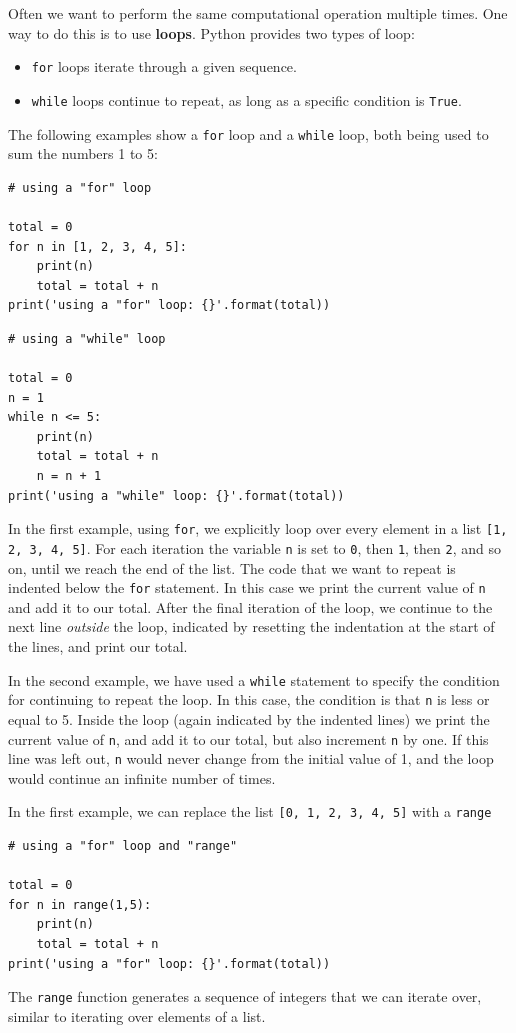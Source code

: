 \documentclass[a4paper]{article}
\begin{document}
Often we want to perform the same computational operation multiple times. One way to do this is to use \textbf{loops}. Python provides two types of loop: 
\begin{itemize}
	\item{\texttt{for} loops iterate through a given sequence.}
	\item{\texttt{while} loops continue to repeat, as long as a specific condition is \texttt{True}.}
\end{itemize}
The following examples show a \texttt{for} loop and a \texttt{while} loop, both being used to sum the numbers 1 to 5:
\begin{lstlisting}
# using a "for" loop

total = 0
for n in [1, 2, 3, 4, 5]:
    print(n)
    total = total + n
print('using a "for" loop: {}'.format(total))
\end{lstlisting}
\begin{lstlisting}
# using a "while" loop

total = 0
n = 1
while n <= 5:
    print(n)
    total = total + n
    n = n + 1
print('using a "while" loop: {}'.format(total))
\end{lstlisting}
In the first example, using \texttt{for}, we explicitly loop over every element in a list \texttt{[1, 2, 3, 4, 5]}. For each iteration the variable \texttt{n} is set to \texttt{0}, then \texttt{1}, then \texttt{2}, and so on, until we reach the end of the list. The code that we want to repeat is indented below the \texttt{for} statement. In this case we print the current value of \texttt{n} and add it to our total. After the final iteration of the loop, we continue to the next line \emph{outside} the loop, indicated by resetting the indentation at the start of the lines, and print our total.

In the second example, we have used a \texttt{while} statement to specify the condition for continuing to repeat the loop. In this case, the condition is that \texttt{n} is less or equal to 5. Inside the loop (again indicated by the indented lines) we print the current value of \texttt{n}, and add it to our total, but also increment \texttt{n} by one. If this line was left out, \texttt{n} would never change from the initial value of 1, and the loop would continue an infinite number of times.

In the first example, we can replace the list \texttt{[0, 1, 2, 3, 4, 5]} with a \texttt{range}
\begin{lstlisting}
# using a "for" loop and "range"

total = 0
for n in range(1,5):
    print(n)
    total = total + n
print('using a "for" loop: {}'.format(total))
\end{lstlisting}
The \texttt{range} function generates a sequence of integers that we can iterate over, similar to iterating over elements of a list.
\end{document}
